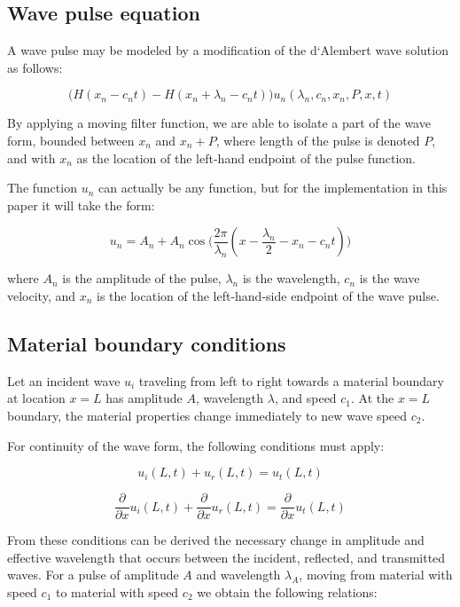 \documentclass[twocolumn, letterpaper]{article}
\begin{document}
\subsection{Wave pulse equation}
A wave pulse may be modeled by a modification of the d`Alembert wave  solution as follows:

\begin{equation}
\Big(H(x_n - c_nt) - H(x_n + \lambda_n -c_nt)\Big) u_n(\lambda_n,c_n,x_n,P,x,t)%
\end{equation}

By applying a moving filter function, we are able to isolate a part of the wave form, bounded between $x_n$ and $x_n  +P$, where length of the pulse is denoted $P$, and with $x_n$ as the location of the left-hand endpoint of the pulse function.

The function $u_n$ can actually be any function, but for the implementation in this paper it will take the form:

\begin{equation}
u_n = A_n + A_n \cos\Big(\frac{2\pi}{\lambda_n}(x - \frac{\lambda_n}{2} -x_n - c_n t) \Big)
\end{equation}

\noindent where $A_n$ is the amplitude of the pulse, $\lambda_n$ is the wavelength, $c_n$ is the wave velocity, and $x_n$ is the location of the left-hand-side endpoint of the wave pulse.

\subsection{Material boundary conditions}
Let an incident wave $u_i$ traveling from left to right towards a material boundary at location $x=L$ has amplitude $A$, wavelength $\lambda$, and speed $c_1$. At the $x=L$ boundary, the material properties change immediately to new wave speed $c_2$.

For continuity of the wave form, the following conditions must apply:

\begin{equation}
u_i(L,t) +u_r(L,t) = u_t(L,t)
\end{equation}

\begin{equation}
 \frac{\partial}{\partial x}   u_i(L,t) +  \frac{\partial}{\partial x} u_r(L,t) =  \frac{\partial}{\partial x} u_t(L,t)
\end{equation}

From these conditions can be derived the necessary change in amplitude and effective wavelength that occurs between the incident, reflected, and transmitted waves. For a pulse of amplitude $A$ and wavelength $\lambda_A$, moving from material with speed $c_1$ to material with speed $c_2$ we obtain the following relations:
\end{document}
